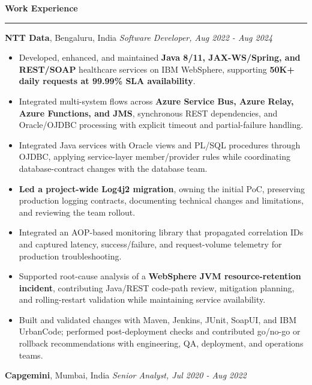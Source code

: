 \documentclass[11pt,letterpaper]{article}
\newcommand{\ressection}[1]{\Needspace{6\baselineskip}\vspace{8pt}\par\textbf{#1}\par\vspace{2pt}\hrule\vspace{5pt}}
\begin{document}
\ressection{Work Experience}
\textbf{NTT Data}, Bengaluru, India \hfill \textit{Software Developer, Aug 2022 - Aug 2024}
\begin{itemize}
  \item Developed, enhanced, and maintained \textbf{Java 8/11, JAX-WS/Spring, and REST/SOAP} healthcare services on IBM WebSphere, supporting \textbf{50K+ daily requests at 99.99\% SLA availability}.
  \item Integrated multi-system flows across \textbf{Azure Service Bus, Azure Relay, Azure Functions, and JMS}, synchronous REST dependencies, and Oracle/OJDBC processing with explicit timeout and partial-failure handling.
  \item Integrated Java services with Oracle views and PL/SQL procedures through OJDBC, applying service-layer member/provider rules while coordinating database-contract changes with the database team.
  \item \textbf{Led a project-wide Log4j2 migration}, owning the initial PoC, preserving production logging contracts, documenting technical changes and limitations, and reviewing the team rollout.
  \item Integrated an AOP-based monitoring library that propagated correlation IDs and captured latency, success/failure, and request-volume telemetry for production troubleshooting.
  \item Supported root-cause analysis of a \textbf{WebSphere JVM resource-retention incident}, contributing Java/REST code-path review, mitigation planning, and rolling-restart validation while maintaining service availability.
  \item Built and validated changes with Maven, Jenkins, JUnit, SoapUI, and IBM UrbanCode; performed post-deployment checks and contributed go/no-go or rollback recommendations with engineering, QA, deployment, and operations teams.
\end{itemize}
\textbf{Capgemini}, Mumbai, India \hfill \textit{Senior Analyst, Jul 2020 - Aug 2022}
\end{document}
